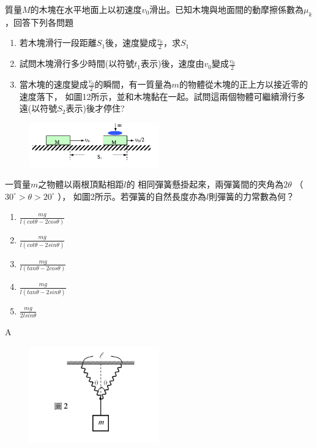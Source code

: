 \documentclass[cn,10pt,math=newtx,chinesefont=founder]{elegantbook}
\begin{document}
\begin{example}
    質量$M$的木塊在水平地面上以初速度$v_0$滑出。已知木塊與地面間的動摩擦係數為$\mu_k$，回答下列各問題
    \begin{enumerate}
        \item 若木塊滑行一段距離$S_1$後，速度變成$\frac{v_0}{2}$，求$S_1$
        \item 試問木塊滑行多少時間(以符號$t_1$表示)後，速度由$v_0$變成$\frac{v_0}{2}$
        \item 當木塊的速度變成$\frac{v_0}{2}$的瞬間，有一質量為$m$的物體從木塊的正上方以接近零的速度落下，
        如圖12所示，並和木塊黏在一起。試問這兩個物體可繼續滑行多遠(以符號$S_2$表示)後才停住?
    \end{enumerate}
    \rightline{[93指考]}
\end{example}
\begin{figure}[htbp]
    \flushright
    \includegraphics[width=0.5\textwidth]{image/93_n_1.png}
\end{figure}
\newpage


\begin{example}
    一質量$m$之物體以兩根頂點相距$l$的
    相同彈簧懸掛起來，兩彈簧間的夾角為$2\theta$ （$30^\circ >\theta > 20^\circ$ ），
    如圖2所示。若彈簧的自然長度亦為$l$則彈簧的力常數為何？  
    \begin{enumerate}[label=(\Alph*)]
        \item $\frac{mg}{l(cot\theta -2cos\theta)}$
        \item $\frac{mg}{l(cot\theta -2sin\theta)}$
        \item $\frac{mg}{l(tan\theta -2cos\theta)}$
        \item $\frac{mg}{l(tan\theta -2sin\theta)}$
        \item $\frac{mg}{2l sin\theta}$
    \end{enumerate}
    \rightline{[93指考補考]}
\end{example}

\begin{solution}
    A
\end{solution}
\begin{figure}[htbp]
    \flushright
    \includegraphics[width=0.5\textwidth]{image/93_c_8.png}
\end{figure}
\newpage
\end{document}
